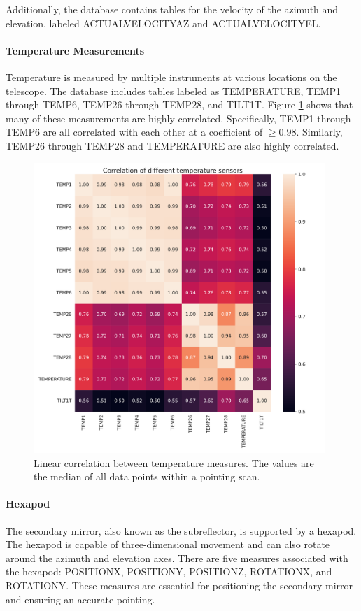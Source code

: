 Additionally, the database contains tables for the velocity of the azimuth and elevation, labeled ACTUALVELOCITYAZ and ACTUALVELOCITYEL.

\paragraph{Temperature Measurements}
Temperature is measured by multiple instruments at various locations on the telescope.
The database includes tables labeled as TEMPERATURE, TEMP1 through TEMP6, TEMP26 through TEMP28, and TILT1T.
Figure \ref{fig:corr_temp} shows that many of these measurements are highly correlated.
Specifically, TEMP1 through TEMP6 are all correlated with each other at a coefficient of $\geq 0.98$.
Similarly, TEMP26 through TEMP28 and TEMPERATURE are also highly correlated.

\begin{figure}[H]
    \centering
    \includegraphics[width=0.98\textwidth]{Correlation/Correlation_temp.pdf}
    \caption{Linear correlation between temperature measures.
    The values are the median of all data points within a pointing scan.}
    \label{fig:corr_temp}
\end{figure}

\paragraph{Hexapod}
The secondary mirror, also known as the subreflector, is supported by a hexapod. 
The hexapod is capable of three-dimensional movement and can also rotate around the azimuth and elevation axes.
There are five measures associated with the hexapod: POSITIONX, POSITIONY, POSITIONZ, ROTATIONX, and ROTATIONY.
These measures are essential for positioning the secondary mirror and ensuring an accurate pointing.

